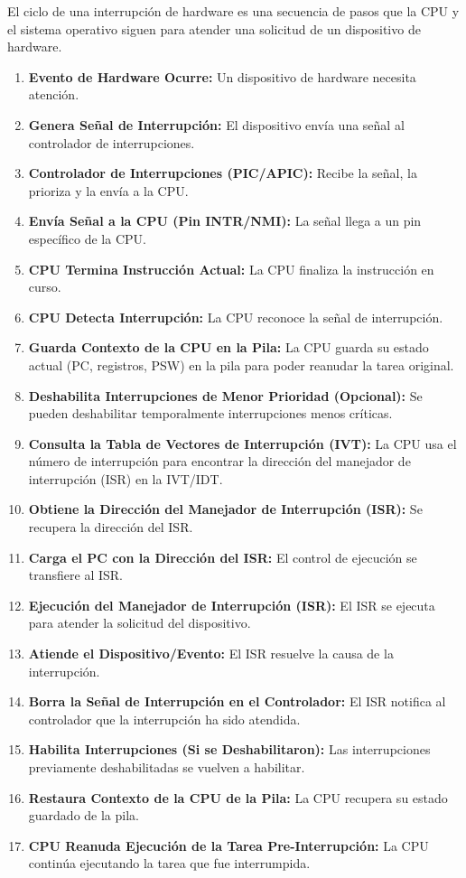 \documentclass[12pt,a4paper]{article}
\begin{document}
	
	El ciclo de una interrupción de hardware es una secuencia de pasos que la CPU y el sistema operativo siguen para atender una solicitud de un dispositivo de hardware.
	
	\begin{enumerate}[label=\arabic*.]
		\item \textbf{Evento de Hardware Ocurre:} Un dispositivo de hardware necesita atención.
		\item \textbf{Genera Señal de Interrupción:} El dispositivo envía una señal al controlador de interrupciones.
		\item \textbf{Controlador de Interrupciones (PIC/APIC):} Recibe la señal, la prioriza y la envía a la CPU.
		\item \textbf{Envía Señal a la CPU (Pin INTR/NMI):} La señal llega a un pin específico de la CPU.
		\item \textbf{CPU Termina Instrucción Actual:} La CPU finaliza la instrucción en curso.
		\item \textbf{CPU Detecta Interrupción:} La CPU reconoce la señal de interrupción.
		\item \textbf{Guarda Contexto de la CPU en la Pila:} La CPU guarda su estado actual (PC, registros, PSW) en la pila para poder reanudar la tarea original.
		\item \textbf{Deshabilita Interrupciones de Menor Prioridad (Opcional):} Se pueden deshabilitar temporalmente interrupciones menos críticas.
		\item \textbf{Consulta la Tabla de Vectores de Interrupción (IVT):} La CPU usa el número de interrupción para encontrar la dirección del manejador de interrupción (ISR) en la IVT/IDT.
		\item \textbf{Obtiene la Dirección del Manejador de Interrupción (ISR):} Se recupera la dirección del ISR.
		\item \textbf{Carga el PC con la Dirección del ISR:} El control de ejecución se transfiere al ISR.
		\item \textbf{Ejecución del Manejador de Interrupción (ISR):} El ISR se ejecuta para atender la solicitud del dispositivo.
		\item \textbf{Atiende el Dispositivo/Evento:} El ISR resuelve la causa de la interrupción.
		\item \textbf{Borra la Señal de Interrupción en el Controlador:} El ISR notifica al controlador que la interrupción ha sido atendida.
		\item \textbf{Habilita Interrupciones (Si se Deshabilitaron):} Las interrupciones previamente deshabilitadas se vuelven a habilitar.
		\item \textbf{Restaura Contexto de la CPU de la Pila:} La CPU recupera su estado guardado de la pila.
		\item \textbf{CPU Reanuda Ejecución de la Tarea Pre-Interrupción:} La CPU continúa ejecutando la tarea que fue interrumpida.
	\end{enumerate}
	
\end{document}
